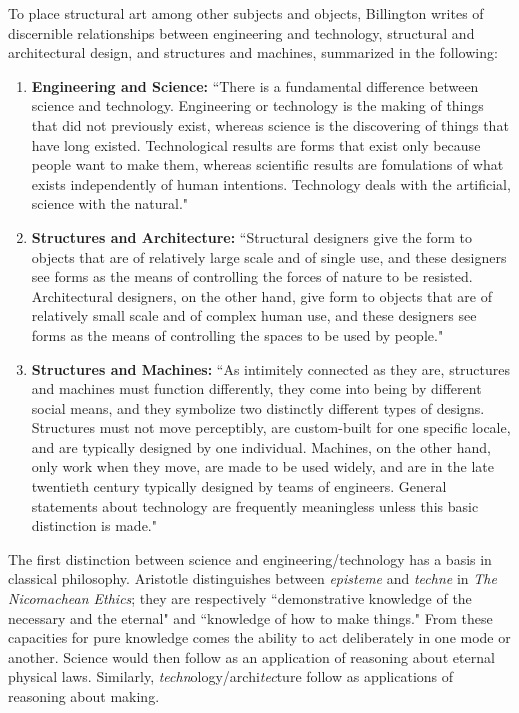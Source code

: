 To place structural art among other subjects and objects, Billington writes of discernible relationships between engineering and technology, structural and architectural design, and structures and machines, summarized in the following:

\begin{enumerate}
  \item [] \textbf{Engineering and Science:} ``There is a fundamental difference between science and technology. Engineering or technology is the making of things that did not previously exist, whereas science is the discovering of things that have long existed. Technological results are forms that exist only because people want to make them, whereas scientific results are fomulations of what exists independently of human intentions. Technology deals with the artificial, science with the natural."\cite[p9]{TOWERANDBRIDGE}

  \item [] \textbf{Structures and Architecture:} ``Structural designers give the form to objects that are of relatively large scale and of single use, and these designers see forms as the means of controlling the forces of nature to be resisted. Architectural designers, on the other hand, give form to objects that are of relatively small scale and of complex human use, and these designers see forms as the means of controlling the spaces to be used by people." \cite[14]{TOWERANDBRIDGE}

  \item[] \textbf{Structures and Machines:} ``As intimitely connected as they are, structures and machines must function differently, they come into being by different social means, and they symbolize two distinctly different types of designs. Structures must not move perceptibly, are custom-built for one specific locale, and are typically designed by one individual. Machines, on the other hand, only work when they move, are made to be used widely, and are in the late twentieth century typically designed by teams of engineers. General statements about technology are frequently meaningless unless this basic distinction is made."\cite[p13]{TOWERANDBRIDGE}

\end{enumerate}

The first distinction between science and engineering/technology has a basis in classical philosophy. Aristotle distinguishes between \textit{episteme} and \textit{techne} in \textit{The Nicomachean Ethics}; they are respectively ``demonstrative knowledge of the necessary and the eternal" and ``knowledge of how to make things." \cite[p104, 105]{NICOMACHEANETHICS} From these capacities for pure knowledge comes the ability to act deliberately in one mode or another. Science would then follow as an application of reasoning about eternal physical laws. Similarly, \textit{techn}ology/archi\textit{tec}ture follow as applications of reasoning about making.

